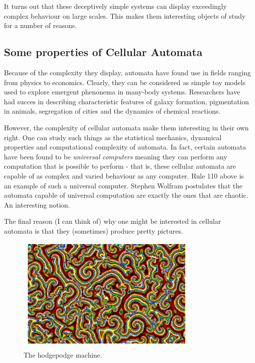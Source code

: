 \documentclass[12pt]{article}
\numberwithin{equation}{section}
\begin{document}
It turns out that these deceptively simple systems can display exceedingly complex behaviour on large scales. This makes them interesting objects of study for a number of reasons.

\subsection{Some properties of Cellular Automata}
Because of the complexity they display, automata have found use in fields ranging from physics to economics. Clearly, they can be considered as simple toy models used to explore emergent phenonema in many-body systems. Researchers have had succes in describing characteristic features of galaxy formation, pigmentation in animals, segregation of cities and the dynamics of chemical reactions.

However, the complexity of cellular automata make them interesting in their own right. One can study such things as the statistical mechanics, dynamical properties and computational complexity of automata. In fact, certain automata have been found to be \textit{universal computers} meaning they can perform any computation that is possible to perform - that is, these cellular automata are capable of as complex and varied behaviour as any computer. Rule 110 above is an example of such a universal computer. Stephen Wolfram postulates that the automata capable of universal computation are exactly the ones that are chaotic. An interesting notion.

The final reason (I can think of) why one might be interested in cellular automata is that they (sometimes) produce pretty pictures.
\begin{figure}[H]
\centering
\includegraphics[width=0.8\textwidth]{HodgepodgeMachine.png}
\caption{The hodgepodge machine.}
\label{HodgepodgeMachine}
\end{figure}  
\end{document}
